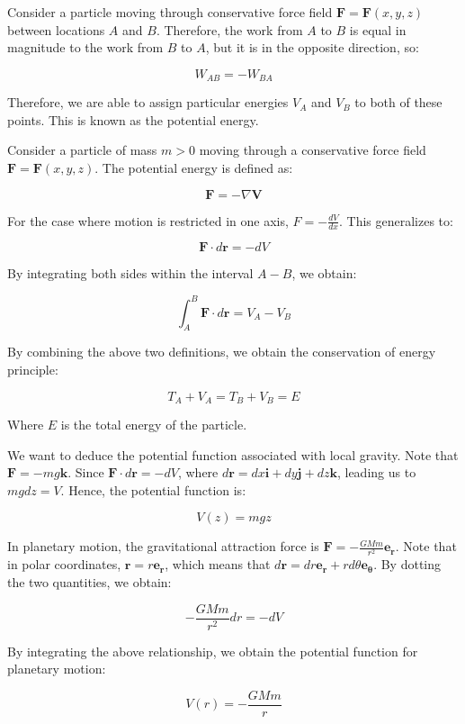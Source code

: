 \documentclass[12pt]{article}
\begin{document}
Consider a particle moving through conservative force field $\mathbf{F} = \mathbf{F}\left(x, y, z\right)$ between locations $A$ and $B$. Therefore, the work from $A$ to $B$ is equal in magnitude to the work from $B$ to $A$, but it is in the opposite direction, so:

\[ W_{AB} = -W_{BA} \]

Therefore, we are able to assign particular energies $V_A$ and $V_B$ to both of these points. This is known as the potential energy.

\begin{definition}
    Consider a particle of mass $m > 0$ moving through a conservative force field $\mathbf{F} = \mathbf{F}\left(x, y, z\right)$. The potential energy is defined as:

    \[ \mathbf{F} = - \nabla \mathbf{V} \]
\end{definition}

For the case where motion is restricted in one axis, $F = -\frac{dV}{dx}$. This generalizes to:

\[ \mathbf{F} \cdot d\mathbf{r} = -dV \]

By integrating both sides within the interval $A - B$, we obtain:

\[ \int_A^B \mathbf{F} \cdot d\mathbf{r} = V_A - V_B \]

By combining the above two definitions, we obtain the conservation of energy principle:

\[ T_A + V_A = T_B + V_B = E \]

Where $E$ is the total energy of the particle.

\begin{example}
    We want to deduce the potential function associated with local gravity. Note that $\mathbf{F} = -mg\mathbf{k}$. Since $\mathbf{F} \cdot d\mathbf{r} = -dV$, where $d\mathbf{r} = dx\mathbf{i} + dy\mathbf{j} + dz\mathbf{k}$, leading us to $mgdz = V$. Hence, the potential function is:

    \[ V(z) = mgz \]
\end{example}

\begin{example}
    In planetary motion, the gravitational attraction force is $\mathbf{F} = -\frac{GMm}{r^2}\mathbf{e_r}$. Note that in polar coordinates, $\mathbf{r} = r\mathbf{e_r}$, which means that $d\mathbf{r} = dr\mathbf{e_r} + rd\theta \mathbf{e_{\theta}}$. By dotting the two quantities, we obtain:

    \[ -\frac{GMm}{r^2}dr = -dV \]

    By integrating the above relationship, we obtain the potential function for planetary motion:

    \[ V(r) = -\frac{GMm}{r} \]
\end{example}
\end{document}

